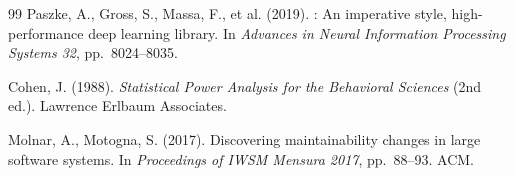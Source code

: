\documentclass[11pt,a4paper]{article}
\begin{document}
\begin{thebibliography}{99}
Paszke, A., Gross, S., Massa, F., et al. (2019).
: An imperative style, high-performance deep learning
  library.
\newblock In \emph{Advances in Neural Information Processing Systems 32},
  pp.\ 8024--8035.

Cohen, J. (1988).
\newblock \emph{Statistical Power Analysis for the Behavioral Sciences} (2nd
  ed.).
\newblock Lawrence Erlbaum Associates.

Molnar, A., Motogna, S. (2017).
\newblock Discovering maintainability changes in large software systems.
\newblock In \emph{Proceedings of IWSM Mensura 2017}, pp.\ 88--93. ACM.

\end{thebibliography}
\end{document}
